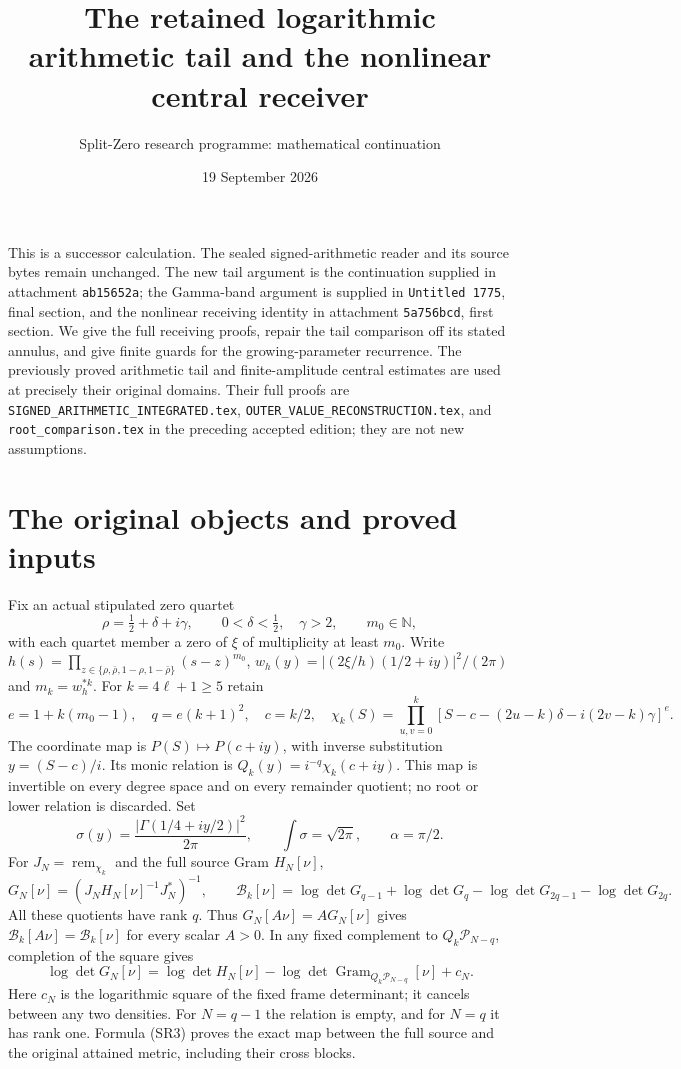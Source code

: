 \documentclass[11pt]{article}
\title{The retained logarithmic arithmetic tail and the nonlinear central receiver}
\author{Split-Zero research programme: mathematical continuation}
\date{19 September 2026}
\newcommand{\PP}{\mathcal P}\newcommand{\BB}{\mathcal B}
\newcommand{\Gram}{\operatorname{Gram}}\newcommand{\rank}{\operatorname{rank}}
\begin{document}
\maketitle
\noindent This is a successor calculation. The sealed signed-arithmetic reader and
its source bytes remain unchanged. The new tail argument is the continuation
supplied in attachment \texttt{ab15652a}; the Gamma-band argument is supplied in
\texttt{Untitled 1775}, final section, and the nonlinear receiving identity in
attachment \texttt{5a756bcd}, first section. We give the full receiving proofs,
repair the tail comparison off its stated annulus, and give finite guards for
the growing-parameter recurrence. The previously proved arithmetic tail and
finite-amplitude central estimates are used at precisely their original domains.
Their full proofs are \texttt{SIGNED\_ARITHMETIC\_INTEGRATED.tex},
\texttt{OUTER\_VALUE\_RECONSTRUCTION.tex}, and \texttt{root\_comparison.tex}
in the preceding accepted edition; they are not new assumptions.

\section{The original objects and proved inputs}
Fix an actual stipulated zero quartet
\[
 \rho=\tfrac12+\delta+i\gamma,\qquad 0<\delta<\tfrac12,\quad\gamma>2,
 \qquad m_0\in\mathbb N,
\]
with each quartet member a zero of $\xi$ of multiplicity at least $m_0$.
Write $h(s)=\prod_{z\in\{\rho,\bar\rho,1-\rho,1-\bar\rho\}}(s-z)^{m_0}$,
$w_h(y)=|(2\xi/h)(1/2+iy)|^2/(2\pi)$ and $m_k=w_h^{*k}$.
For $k=4\ell+1\ge5$ retain
\begin{equation}\tag{SR1}
 e=1+k(m_0-1),\quad q=e(k+1)^2,\quad c=k/2,\quad
 \chi_k(S)=\prod_{u,v=0}^k
 [S-c-(2u-k)\delta-i(2v-k)\gamma]^e.
\end{equation}
The coordinate map is $P(S)\mapsto P(c+iy)$, with inverse substitution
$y=(S-c)/i$. Its monic relation is $Q_k(y)=i^{-q}\chi_k(c+iy)$.
This map is invertible on every degree space and on every remainder quotient;
no root or lower relation is discarded. Set
\[
 \sigma(y)=\frac{|\Gamma(1/4+iy/2)|^2}{2\pi},\qquad
 \int\sigma=\sqrt{2\pi},\qquad \alpha=\pi/2.
\]
For $J_N=\operatorname{rem}_{\chi_k}$ and the full source Gram $H_N[\nu]$,
\begin{equation}\tag{SR2}
 G_N[\nu]=(J_NH_N[\nu]^{-1}J_N^*)^{-1},\qquad
 \BB_k[\nu]=\log\det G_{q-1}+\log\det G_q
             -\log\det G_{2q-1}-\log\det G_{2q}.
\end{equation}
All these quotients have rank $q$. Thus $G_N[A\nu]=AG_N[\nu]$ gives
$\BB_k[A\nu]=\BB_k[\nu]$ for every scalar $A>0$.
In any fixed complement to $Q_k\PP_{N-q}$, completion of the square gives
\begin{equation}\tag{SR3}
 \log\det G_N[\nu]=\log\det H_N[\nu]
 -\log\det\Gram_{Q_k\PP_{N-q}}[\nu]+c_N.
\end{equation}
Here $c_N$ is the logarithmic square of the fixed frame determinant; it cancels
between any two densities. For $N=q-1$ the relation is empty, and for $N=q$ it
has rank one. Formula (SR3) proves the exact map between the full source and
the original attained metric, including their cross blocks.
\end{document}
